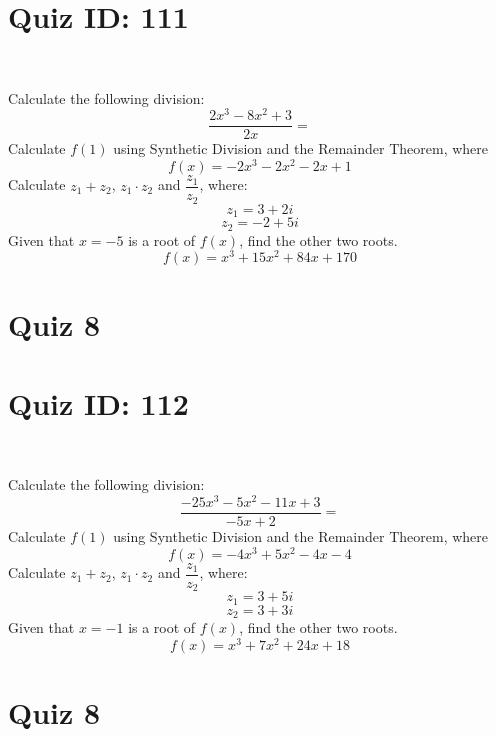 \documentclass{exam}
\begin{document}
\section*{Quiz ID: 111}
\vspace{0.5cm}\
\vspace{1cm}\
\begin{questions}
\question Calculate the following division:\[\dfrac{
2x^3 - 8x^2 + 3}{
2x}=\] \makeemptybox{\stretch{2}}
\question Calculate $f(1)$ using Synthetic Division and the Remainder Theorem, where\[f(x) = 
-2x^3 - 2x^2 - 2x + 1\]
\newpage\question Calculate $z_1+z_2$, $z_1\cdot z_2$ and $\dfrac{z_1}{z_2}$, where:\[z_1=3+2\mathit{i}\]\[z_2=-2+5\mathit{i}\]
\question Given that $x=-5$ is a root of $f(x)$, find the other two roots.\[f(x)=
x^3 + 15x^2 + 84x + 170\]\makeemptybox{\stretch{1}}
\end{questions}\newpage
\newpage
\section*{Quiz 8}
\section*{Quiz ID: 112}
\vspace{0.5cm}\
\vspace{1cm}\
\begin{questions}
\question Calculate the following division:\[\dfrac{
-25x^3 - 5x^2 - 11x + 3}{
-5x + 2}=\] 
\question Calculate $f(1)$ using Synthetic Division and the Remainder Theorem, where\[f(x) = 
-4x^3 + 5x^2 - 4x - 4\]
\newpage\question Calculate $z_1+z_2$, $z_1\cdot z_2$ and $\dfrac{z_1}{z_2}$, where:\[z_1=3+5\mathit{i}\]\[z_2=3+3\mathit{i}\]\makeemptybox{\stretch{1}}
\question Given that $x=-1$ is a root of $f(x)$, find the other two roots.\[f(x)=
x^3 + 7x^2 + 24x + 18\]\makeemptybox{\stretch{1}}
\end{questions}\newpage
\newpage
\section*{Quiz 8}
\end{document}
